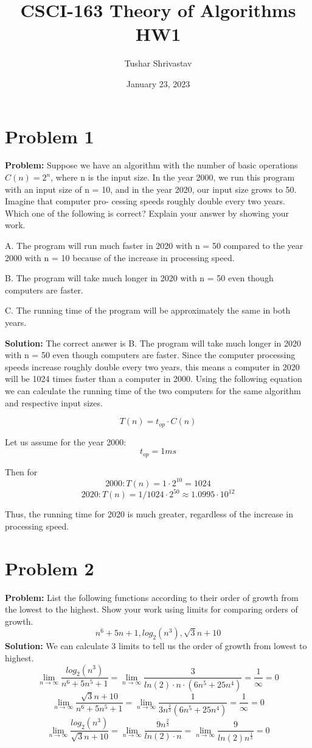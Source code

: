 \documentclass{article}
\title{CSCI-163 Theory of Algorithms HW1}
\author{Tushar Shrivastav}
\date{January 23, 2023}
\begin{document}
\maketitle

\section{Problem 1}
\textbf{Problem:} 
Suppose we have an algorithm with the number of basic operations $C(n) = 2^n$,
where n is the input size. In the year 2000, we run this program with an input size of
n = 10, and in the year 2020, our input size grows to 50. Imagine that computer pro-
cessing speeds roughly double every two years. Which one of the following is correct?
Explain your answer by showing your work.

A. The program will run much faster in 2020 with n = 50 compared to the year 2000
with n = 10 because of the increase in processing speed.

B. The program will take much longer in 2020 with n = 50 even though computers
are faster.

C. The running time of the program will be approximately the same in both years.

\textbf{Solution:}
The correct answer is B. The program will take much longer in 2020 with n = 50 even though computers are faster. Since the computer processing speeds increase roughly double every two years, this means a computer in 2020 will be 1024 times faster than a computer in 2000. Using the following equation we can calculate the running time of the two computers for the same algorithm and respective input sizes.

\begin{equation}
    T(n) = t_{op} \cdot C(n)
\end{equation}

Let us assume for the year 2000: \[t_{op} = 1 ms\] 

Then for  \[2000: T(n) = 1 \cdot 2^{10} = 1024\] \[2020: T(n) = 1/1024 \cdot 2^{50} \approx 1.0995 \cdot 10^{12}\]

Thus, the running time for 2020 is much greater, regardless of the increase in processing speed.

\section{Problem 2}
\textbf{Problem:} List the following functions according to their order of growth from the lowest
to the highest. Show your work using limits for comparing orders of growth.
\[n^6 +5n +1, log_2(n^3), \sqrt{3}{n} + 10\]
\textbf{Solution: }
We can calculate 3 limits to tell us the order of growth from lowest to highest.
\[ \lim_{n\to\infty} \frac{log_2(n^3)}{n^6+5n^5+1} = \lim_{n\to\infty} \frac{3}{ln(2)\cdot n \cdot (6n^5 +25n^4)} = \frac{1}{\infty} = 0\]
\[ \lim_{n\to\infty} \frac{\sqrt{3}{n}+10}{n^6+5n^5+1} = \lim_{n\to\infty} \frac{1}{3n^{\frac{2}{3}}(6n^5 +25n^4)} = \frac{1}{\infty} = 0 \]
\[ \lim_{n\to\infty} \frac{log_2(n^3)}{\sqrt{3}{n}+10} = \lim_{n\to\infty} \frac{9n^{\frac{2}{3}} }{ln(2)\cdot n} = \lim_{n\to\infty} {\frac{9}{ln(2)n^{\frac{1}{3}}}} = 0\]
\end{document}
